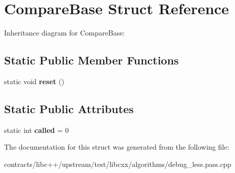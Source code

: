 \hypertarget{struct_compare_base}{}\section{Compare\+Base Struct Reference}
\label{struct_compare_base}


Inheritance diagram for Compare\+Base\+:
\subsection*{Static Public Member Functions}
\begin{DoxyCompactItemize}
\item 
\mbox{\label{struct_compare_base_ab81929ff7a5431dd360de866b1deafd0}} 
static void {\bfseries reset} ()
\end{DoxyCompactItemize}
\subsection*{Static Public Attributes}
\begin{DoxyCompactItemize}
\item 
\mbox{\label{struct_compare_base_a20fcd1af2b6b529b470f97ddba0ca2f8}} 
static int {\bfseries called} = 0
\end{DoxyCompactItemize}


The documentation for this struct was generated from the following file\+:\begin{DoxyCompactItemize}
\item 
contracts/libc++/upstream/test/libcxx/algorithms/debug\+\_\+less.\+pass.\+cpp\end{DoxyCompactItemize}
